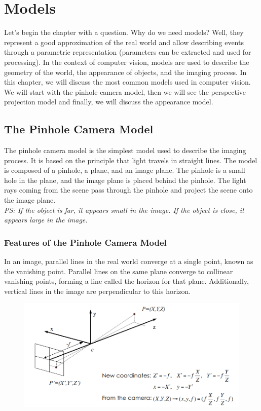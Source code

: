 \chapter{Models}
Let's begin the chapter with a question. Why do we need models?
Well, they represent a good approximation of the real world and allow describing events through a parametric representation (parameters can be extracted and used for processing). In the context of computer vision, models are used to describe the geometry of the world, the appearance of objects, and the imaging process. In this chapter, we will discuss the most common models used in computer vision. We will start with the pinhole camera model, then we will see the perspective projection model and finally, we will discuss the appearance model.
\section{The Pinhole Camera Model}
The pinhole camera model is the simplest model used to describe the imaging process. It is based on the principle that light travels in straight lines. The model is composed of a pinhole, a plane, and an image plane. The pinhole is a small hole in the plane, and the image plane is placed behind the pinhole. The light rays coming from the scene pass through the pinhole and project the scene onto the image plane. 
\\\textit{PS: If the object is far, it appears small in the image. If the object is close, it appears large in the image.}
\subsection{Features of the Pinhole Camera Model}
In an image, parallel lines in the real world converge at a single point, known as the vanishing point. Parallel lines on the same plane converge to collinear vanishing points, forming a line called the horizon for that plane. Additionally, vertical lines in the image are perpendicular to this horizon.
\begin{figure}[h]
    \centering
    \includegraphics[width=1\textwidth]{Figures/Pinhole.png}
\end{figure}
